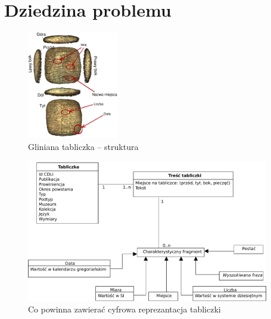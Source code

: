 \section{Dziedzina problemu}

\begin{figure}
 \centering
 \includegraphics[width=150px]{../diagramy/tabliczka.pdf}
 \caption{\label{fig:tabliczka}Gliniana tabliczka -- struktura}
\end{figure}



\begin{figure}
 \centering
 \includegraphics[width=400px]{../diagramy/Model-dziedziny.pdf}
 \caption{Co powinna zawierać cyfrowa reprezantacja tabliczki}
\end{figure}
~ 

